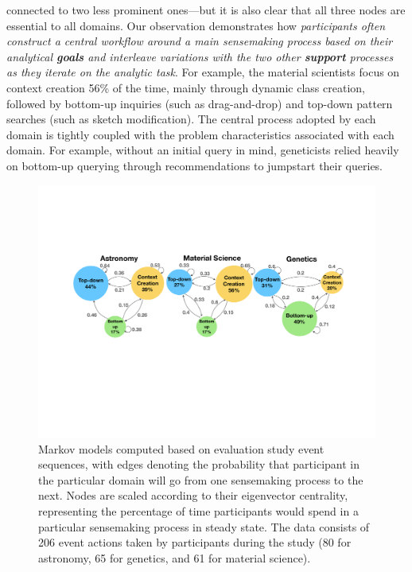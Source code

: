  connected to two less prominent ones---but it is also clear
 that all three nodes are essential to all domains.
 Our observation demonstrates how \emph{participants
 often construct a central workflow
 around a main sensemaking process based on their analytical \textbf{goals}
 and interleave variations with the two other \textbf{support} processes as they iterate on the analytic task}. %
 For example, the material scientists focus on context creation 56\% of the time, mainly through dynamic class creation, followed by bottom-up inquiries (such as drag-and-drop) and top-down pattern searches (such as sketch modification).
 The central process adopted by each domain
 is tightly coupled with the problem characteristics associated with each domain. For example, without an initial query in mind,
 geneticists relied heavily on bottom-up querying
 through recommendations to jumpstart their queries.
  \begin{figure}[ht!]
   \centering
   \includegraphics[width=\linewidth]{figures/markov_transition_new.pdf}
   \caption{Markov models computed based on evaluation study event sequences, with edges denoting the probability that participant in the particular domain will go from one sensemaking process to the next. Nodes are scaled according to their eigenvector centrality, representing the percentage of time participants would spend in a particular sensemaking process in steady state. The data consists of 206 event actions taken by participants during the study (80 for astronomy, 65 for genetics, and 61 for material science).}\label{fig:transition}
   \vspace*{-20pt}
 \end{figure}
